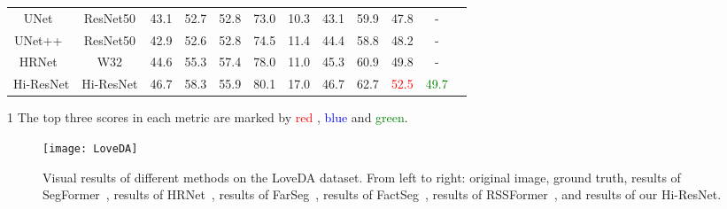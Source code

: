 \documentclass[journal]{IEEEtran}
\begin{document}
\begin{table*}[!t]
\begin{center}
\begin{threeparttable}
{\begin{tabular}{c|c c c c c c c c c c c}
      UNet~\cite{xiao2018unified}& ResNet50 & 43.1 & 52.7 & 52.8 & 73.0 & 10.3 & 43.1 & 59.9 & 47.8 & - \\
      UNet++~\cite{zhou2018unet++} & ResNet50 & 42.9 & 52.6 & 52.8 & 74.5 & 11.4 & 44.4 & 58.8 & 48.2 & - \\
      HRNet~\cite{wang2020deep} & W32 & 44.6 & 55.3 & 57.4 & 78.0 & 11.0 & 45.3 & 60.9 & 49.8 & - \\
      \hline
      Hi-ResNet & Hi-ResNet & 46.7 & 58.3 & 55.9 & 80.1 & 17.0 & 46.7 & 62.7 & \textcolor{red}{52.5} & \textcolor{green}{49.7} \\
      \hline
    \end{tabular}}
        \begin{tablenotes}
        \footnotesize  
        \item[1] The top three scores in each metric are marked by \textcolor{red}{red} , \textcolor{blue}{blue} and \textcolor{green}{green}. 
      \end{tablenotes} 
    \end{threeparttable}
  \end{center}
  \label{table:8}
\end{table*}

\begin{figure*}[t!]
    \centering
    \texttt{[image: LoveDA]}
    \caption{Visual results of different methods on the LoveDA dataset. From left to right: original image, ground truth, results of SegFormer~\cite{xie2021segformer}, results of HRNet~\cite{wang2020deep}, results of FarSeg~\cite{zheng2020foreground}, results of FactSeg~\cite{ma2021factseg}, results of RSSFormer~\cite{xu2023rssformer}, and results of our Hi-ResNet.}
    \label{fig:loveda}
\end{figure*}
\end{document}
